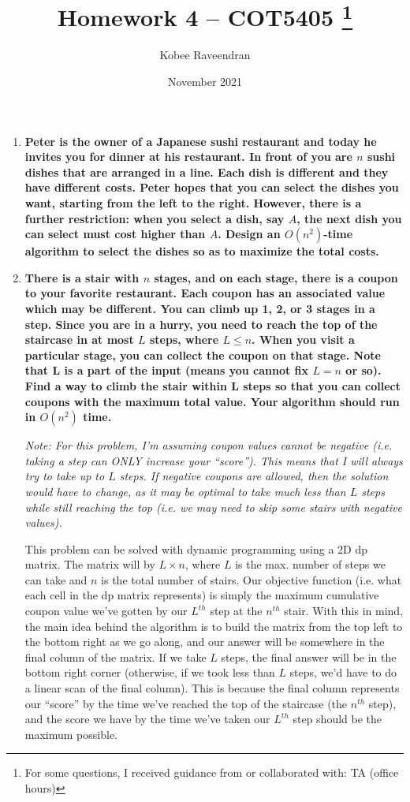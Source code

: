 \documentclass[12pt]{article}
\title{Homework 4 -- COT5405
    \thanks{For some questions, I received guidance from or collaborated with: TA (office hours)}
}
\author{Kobee Raveendran}
\date{November 2021}
\begin{document}
\maketitle

\begin{enumerate}
    \item \textbf{Peter is the owner of a Japanese sushi restaurant and today he invites you for dinner 
    at his restaurant. In front of you are $n$ sushi dishes that are arranged in a line. Each dish is 
    different and they have different costs. Peter hopes that you can select the dishes you want, starting 
    from the left to the right. However, there is a further restriction: when you select a dish, say $A$, the 
    next dish you can select must cost higher than $A$.  Design an $O(n^2)$-time algorithm to select the dishes 
    so as to maximize the total costs.}

    \item \textbf{There is a stair with $n$ stages, and on each stage, there is a coupon to your favorite restaurant. 
    Each coupon has an associated value which may be different. You can climb up 1, 2, or 3 stages in a step. 
    Since you are in a hurry, you need to reach the top of the staircase in at most $L$ steps, where $L \leq n$. When you 
    visit a particular stage, you can collect the coupon on that stage. Note that L is a part of the input 
    (means you cannot fix $L = n$ or so). Find a way to climb the stair within L steps so that you can collect 
    coupons with the maximum total value. Your algorithm should run in $O(n^2)$ time.}

    \textit{Note: For this problem, I'm assuming coupon values cannot be negative (i.e. taking a step can ONLY 
    increase your ``score''). This means that I will always try to take up to $L$ steps. If negative coupons are 
    allowed, then the solution would have to change, as it may be optimal to take much less than $L$ steps while 
    still reaching the top (i.e. we may need to skip some stairs with negative values).}

    This problem can be solved with dynamic programming using a 2D dp matrix. The matrix will by $L \times n$, where $L$ 
    is the max. number of steps we can take and $n$ is the total number of stairs. Our objective function (i.e. what 
    each cell in the dp matrix represents) is simply the maximum cumulative coupon value we've gotten by our $L^{th}$ 
    step at the $n^{th}$ stair. With this in mind, the main idea behind the algorithm is to build the matrix from 
    the top left to the bottom right as we go along, and our answer will be somewhere in the final column of the matrix. 
    If we take $L$ steps, the final answer will be in the bottom right corner (otherwise, if we took less than $L$ steps, 
    we'd have to do a linear scan of the final column). This is because the final column represents our ``score'' by the 
    time we've reached the top of the staircase (the $n^{th}$ step), and the score we have by the time we've taken our 
    $L^{th}$ step should be the maximum possible.


\end{enumerate}
\end{document}
